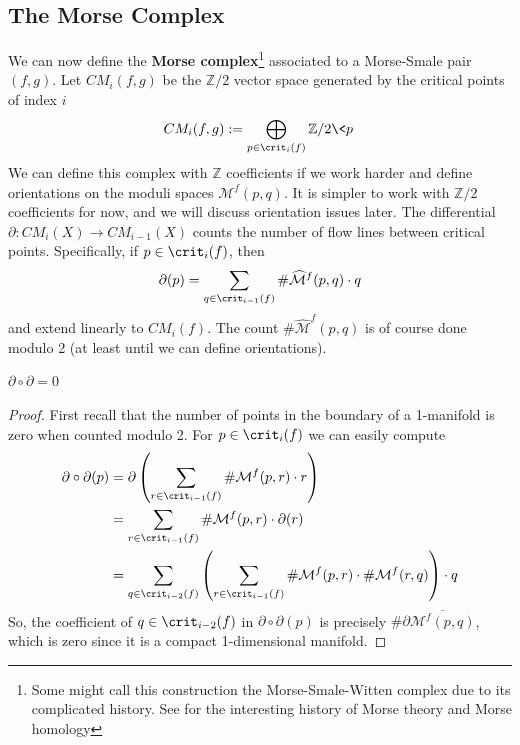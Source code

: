\subsection{The Morse Complex}
\label{The Morse Complex}


We can now define the \textbf{Morse complex}\footnote{Some might call this construction the Morse-Smale-Witten complex due to its complicated history. See \cite{bott1988} for the interesting history of Morse theory and Morse homology} associated to a Morse-Smale pair $(f,g)$. Let $CM_i(f,g)$ be the $\mathbb Z/2$ vector space generated by the critical points of index $i$
\[ CM_i(f,g) := \bigoplus_{p \in \crit_i(f)} \mathbb Z/2 \< p\> \]
We can define this complex with $\mathbb Z$ coefficients if we work harder and define orientations on the moduli spaces $\mathcal M^f(p,q)$. It is simpler to work with $\mathbb Z/2$ coefficients for now, and we will discuss orientation issues later. The differential $\partial : CM_i(X) \rightarrow CM_{i-1}(X)$ counts the number of flow lines between critical points. Specifically, if $p \in \crit_i(f)$, then
\[ \partial(p) = \sum_{q \in \crit_{i-1}(f)} \# \widehat{\mathcal M}^f(p,q) \cdot q \]
and extend linearly to $CM_i(f)$. The count $\# \widehat{\mathcal M}^f(p,q)$ is of course done modulo 2 (at least until we can define orientations).

\begin{prop}
\label{Morse differential}
$\partial \circ \partial = 0$
\end{prop}
\begin{proof}
First recall that the number of points in the boundary of a 1-manifold is zero when counted modulo 2. For $p \in \crit_i(f)$ we can easily compute
\begin{align*}
	\partial \circ \partial (p) &= \partial \left( \sum_{r \in \crit_{i-1}(f)} \# \mathcal M^f(p,r) \cdot r \right) \\
	                            &= \sum_{r \in \crit_{i-1}(f)} \# \mathcal M^f(p,r) \cdot \partial (r) \\
                                &= \sum_{q \in \crit_{i-2}(f)} \left( \sum_{r \in \crit_{i-1}(f)} \# \mathcal M^f(p,r) \cdot \# \mathcal M^f(r,q) \right) \cdot q
\end{align*}
So, the coefficient of $q \in \crit_{i-2}(f)$ in $\partial \circ \partial(p)$ is precisely $\# \partial \overline{\mathcal M^f(p,q)}$, which is zero since it is a compact 1-dimensional manifold.
\end{proof}


